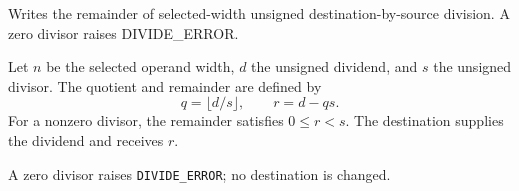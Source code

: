 Writes the remainder of selected-width unsigned destination-by-source division. A zero divisor raises DIVIDE\_ERROR.

Let \(n\) be the selected operand width, \(d\) the unsigned dividend, and \(s\) the unsigned divisor. The quotient and remainder are defined by
\[
  q = \lfloor d/s \rfloor,
  \qquad r = d - qs .
\]
For a nonzero divisor, the remainder satisfies \(0 \le r < s\). The destination supplies the dividend and receives \(r\).

A zero divisor raises \texttt{DIVIDE\_ERROR}; no destination is changed.
